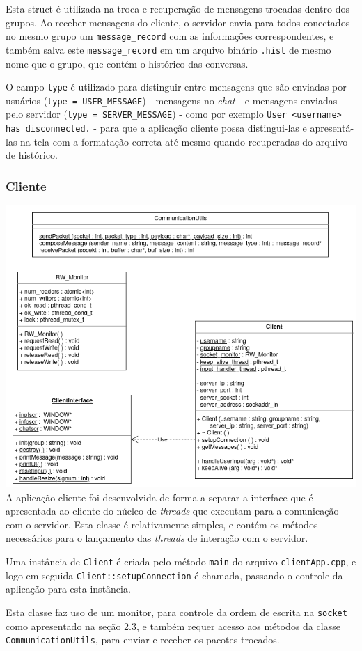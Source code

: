 \documentclass{article}
\begin{document}
\par Esta struct é utilizada na troca e recuperação de mensagens trocadas dentro dos grupos. Ao receber mensagens do cliente, o servidor envia para todos conectados no mesmo grupo um \texttt{message\_record} com as informações correspondentes, e também salva este \texttt{message\_record} em um arquivo binário \texttt{.hist} de mesmo nome que o grupo, que contém o histórico das conversas.
\par O campo \texttt{type} é utilizado para distinguir entre mensagens que são enviadas por usuários (\texttt{type = USER\_MESSAGE}) - mensagens no \textit{chat} - e mensagens enviadas pelo servidor (\texttt{type  = SERVER\_MESSAGE}) - como por exemplo \texttt{User <username> has disconnected.} - para que a aplicação cliente possa distingui-las e apresentá-las na tela com a formatação correta até mesmo quando recuperadas do arquivo de histórico.
\subsubsection{Cliente}
    \includegraphics[width=1.0\textwidth]{Client.png}
A aplicação cliente foi desenvolvida de forma a separar a interface que é apresentada ao cliente do núcleo de \textit{threads} que executam para a comunicação com o servidor. Esta classe é relativamente simples, e contém os métodos necessários para o lançamento das \textit{threads} de interação com o servidor.
\par Uma instância de \texttt{Client} é criada pelo método \texttt{main} do arquivo \texttt{clientApp.cpp}, e logo em seguida \texttt{Client::setupConnection} é chamada, passando o controle da aplicação para esta instância.
\par Esta classe faz uso de um monitor, para controle da ordem de escrita na \texttt{socket} como apresentado na seção 2.3, e também requer acesso aos métodos da classe \texttt{CommunicationUtils}, para enviar e receber os pacotes trocados.
\end{document}
